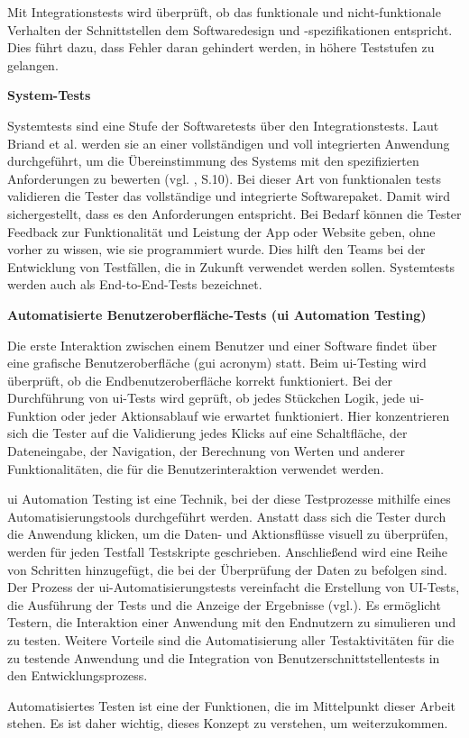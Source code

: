 Mit Integrationstests wird überprüft, ob das funktionale und nicht-funktionale
Verhalten der Schnittstellen dem Softwaredesign und -spezifikationen
entspricht. Dies führt dazu, dass Fehler daran gehindert werden, in höhere
Teststufen zu gelangen.


\textbf{System-Tests}

Systemtests sind eine Stufe der Softwaretests über den Integrationstests.
Laut Briand et al. werden sie an einer vollständigen und voll integrierten
Anwendung durchgeführt, um die Übereinstimmung des Systems mit den
spezifizierten Anforderungen zu bewerten (vgl. \cite{briand2002uml}, S.10).
Bei dieser Art von funktionalen tests validieren die Tester das vollständige
und integrierte Softwarepaket. Damit wird sichergestellt, dass es den
Anforderungen entspricht. Bei Bedarf können die Tester Feedback zur
Funktionalität und Leistung der App oder Website geben, ohne vorher
zu wissen, wie sie programmiert wurde. Dies hilft den Teams bei der
Entwicklung von Testfällen, die in Zukunft verwendet werden sollen.
Systemtests werden auch als End-to-End-Tests bezeichnet.


\textbf{Automatisierte Benutzeroberfläche-Tests (\acs{ui} Automation Testing) }

Die erste Interaktion zwischen einem Benutzer und einer Software findet
über eine grafische Benutzeroberfläche (\acs{gui} acronym) statt. Beim
\acs{ui}-Testing wird überprüft, ob die Endbenutzeroberfläche korrekt
funktioniert. Bei der Durchführung von \acs{ui}-Tests wird geprüft, ob jedes
Stückchen Logik, jede \acs{ui}-Funktion oder jeder Aktionsablauf wie erwartet
funktioniert. Hier konzentrieren sich die Tester auf die Validierung jedes
Klicks auf eine Schaltfläche, der Dateneingabe, der Navigation, der
Berechnung von Werten und anderer Funktionalitäten, die für die
Benutzerinteraktion verwendet werden.


\acs{ui} Automation Testing ist eine Technik, bei der diese Testprozesse mithilfe
eines Automatisierungstools durchgeführt werden. Anstatt dass sich die
Tester durch die Anwendung klicken, um die Daten- und Aktionsflüsse
visuell zu überprüfen, werden für jeden Testfall Testskripte geschrieben.
Anschließend wird eine Reihe von Schritten hinzugefügt, die bei der
Überprüfung der Daten zu befolgen sind. Der Prozess der
\acs{ui}-Automatisierungstests vereinfacht die Erstellung von UI-Tests, die
Ausführung der Tests und die Anzeige der Ergebnisse (vgl.\cite{Perfecto2020}).
Es ermöglicht Testern, die Interaktion einer Anwendung mit den Endnutzern zu
simulieren und zu testen. Weitere Vorteile sind die Automatisierung aller
Testaktivitäten für die zu testende Anwendung und die Integration von
Benutzerschnittstellentests in den Entwicklungsprozess.


Automatisiertes Testen ist eine der Funktionen, die im Mittelpunkt dieser
Arbeit stehen. Es ist daher wichtig, dieses Konzept zu verstehen, um
weiterzukommen.


